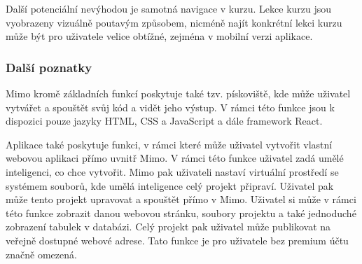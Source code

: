 Další potenciální nevýhodou je samotná navigace v kurzu. Lekce kurzu jsou vyobrazeny vizuálně poutavým způsobem, nicméně najít konkrétní lekci kurzu může být pro uživatele velice obtížné, zejména v mobilní verzi aplikace.

\subsubsection{Další poznatky}

Mimo kromě základních funkcí poskytuje také tzv. pískoviště, kde může uživatel vytvářet a spouštět svůj kód a vidět jeho výstup. V rámci této funkce jsou k dispozici pouze jazyky HTML, CSS a JavaScript a dále framework React.

Aplikace také poskytuje funkci, v rámci které může uživatel vytvořit vlastní webovou aplikaci přímo uvnitř Mimo. V rámci této funkce uživatel zadá umělé inteligenci, co chce vytvořit. Mimo pak uživateli nastaví virtuální prostředí se systémem souborů, kde umělá inteligence celý projekt připraví. Uživatel pak může tento projekt upravovat a spouštět přímo v Mimo. Uživatel si může v rámci této funkce zobrazit danou webovou stránku, soubory projektu a také jednoduché zobrazení tabulek v databázi. Celý projekt pak uživatel může publikovat na veřejně dostupné webové adrese. Tato funkce je pro uživatele bez premium účtu značně omezená.

